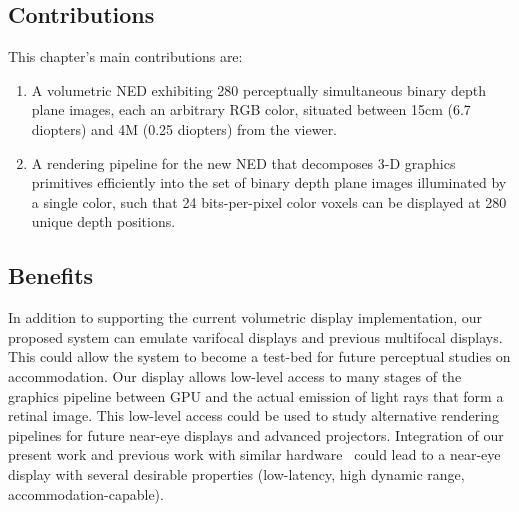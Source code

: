 \subsection{Contributions}
\label{sec:Contributions}
This chapter's main contributions are: 

\begin{enumerate}
\item A volumetric NED exhibiting 280 perceptually simultaneous binary depth plane images, each an arbitrary RGB color, situated between 15cm (6.7 diopters) and 4M (0.25 diopters) from the viewer.
\item A rendering pipeline for the new NED that decomposes 3-D graphics primitives efficiently into the set of binary depth plane images illuminated by a single color, such that 24 bits-per-pixel color voxels can be displayed at 280 unique depth positions.
\end{enumerate}

\begin{comment}
\begin{enumerate}
\item We describe a new rendering pipeline for binary multifocal displays that allows a color voxel to be decomposed into a dense set of binary voxels in a small region around the color voxel. 
We reject the traditional notion that the color volume should be decomposed into a sparse set of color image planes, each located at a different depth. 
We analyze the losses in depth and spatial resolution that might result from the proposed decomposition and discuss mitigation methods.
\item We introduce volumetric NEDs capable of presenting high-resolution color imagery in a \emph{perceptually continuous} depth range across a large range of diopters. We demonstrate a prototype system that displays a 24-bits-per-pixel image in a binary volume composed of 280 focal planes distributed over a depth range of 15cm (6.7 diopters) to 4M (0.26.7 diopters), refreshed at 60 Hz. 
\end{enumerate}
\end{comment}

\subsection{Benefits}
\label{sec:benefits}
In addition to supporting the current volumetric display implementation, our proposed system can emulate varifocal displays and previous multifocal displays. This could allow the system to become a test-bed for future perceptual studies on accommodation. Our display allows low-level access to many stages of the graphics pipeline between GPU and the actual emission of light rays that form a retinal image. This low-level access could be used to study alternative rendering pipelines for future near-eye displays and advanced projectors. Integration of our present work and previous work with similar hardware~\cite{Lincoln2016motion,Lincoln2017scene} could lead to a near-eye display with several desirable properties (low-latency, high dynamic range, accommodation-capable). 
